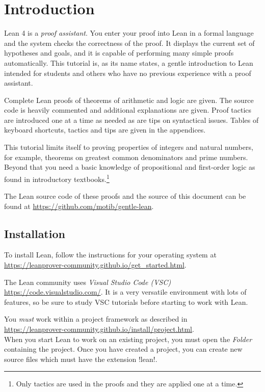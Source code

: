 
\section{Introduction}

Lean 4 is a \emph{proof assistant}. You enter your proof into Lean in a formal language and the system checks the correctness of the proof. It displays the current set of hypotheses and goals, and it is capable of performing many simple proofs automatically. This tutorial is, as its name states, a gentle introduction to Lean intended for students and others who have no previous experience with a proof assistant.

Complete Lean proofs of theorems of arithmetic and logic are given. The source code is heavily commented and additional explanations are given. Proof tactics are introduced one at a time as needed as are tips on syntactical issues. Tables of keyboard shortcuts, tactics and tips are given in the appendices.

This tutorial limits itself to proving properties of integers and natural numbers, for example, theorems on greatest common denominators and prime numbers. Beyond that you need a basic knowledge of propositional and first-order logic as found in introductory textbooks.\footnote{Only tactics are used in the proofs and they are applied one at a time.}

The Lean source code of these proofs and the \XeLaTeX{} source of this document can be found at
\indnt{}\url{https://github.com/motib/gentle-lean}.

\subsection*{Installation}

To install Lean, follow the instructions for your operating system at\\
\indnt\url{https://leanprover-community.github.io/get_started.html}.

The Lean community uses \emph{Visual Studio Code (VSC)} \url{https://code.visualstudio.com/}. It is a very versatile environment with lots of features, so be sure to study VSC tutorials before starting to work with Lean.

You \emph{must} work within a project framework as described in\\ \indnt\url{https://leanprover-community.github.io/install/project.html}.\\ When you start Lean to work on an existing project, you must open the \emph{Folder} containing the project. Once you have created a project, you can create new source files which must have the extension !lean!.

